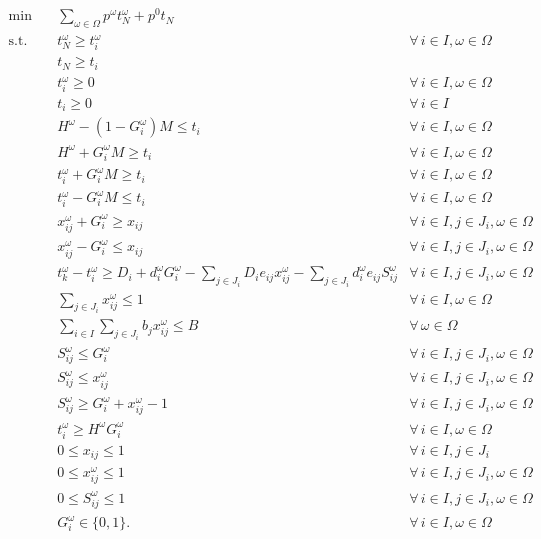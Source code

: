 \documentclass[11pt]{article}
\begin{document}
	\begin{subequations} \label{prob2:extensive}
		\begin{align}
		\min \quad & \sum_{\omega \in \Omega} p^\omega t_N^\omega + p^0 t_N& \\
		\text{s.t.} \quad & t_N^\omega \geq t_i^\omega & \forall \,i \in I, \omega \in \Omega \\
		& t_N \geq t_i & \label{cons:tN}\\
		& t_i^\omega \geq 0 & \forall \,i \in I, \omega \in \Omega\\
		& t_i \geq 0 & \forall \,i \in I\\
		& H^\omega - (1 - G_i^\omega) M \leq t_i & \forall \,i \in I, \omega \in \Omega \label{cons:F}\\
		& H^\omega + G_i^\omega M \geq t_i & \forall \,i \in I, \omega \in \Omega \label{cons:G}\\
		& t_i^\omega + G_i^\omega M \geq t_i & \forall \,i \in I, \omega \in \Omega \label{cons:tf1}\\
		& t_i^\omega - G_i^\omega M \leq t_i & \forall \,i \in I, \omega \in \Omega \label{cons:tf2}\\
		& x_{ij}^\omega + G_i^\omega \geq x_{ij} & \forall \,i \in I, j \in J_i, \omega \in \Omega \label{cons:xf1}\\
		& x_{ij}^\omega - G_i^\omega \leq x_{ij} & \forall \,i \in I, j \in J_i, \omega \in \Omega \label{cons:xf2}\\
		& t_k^\omega - t_i^\omega \geq D_i + d_i^\omega G_i^\omega -\sum_{j \in J_i} D_i e_{ij} x_{ij}^\omega - \sum_{j \in J_i} d_i^\omega e_{ij} S_{ij}^\omega & \forall \,i \in I, j \in J_i, \omega \in \Omega \label{cons:duration}\\
		& \sum_{j \in J_i} x_{ij}^\omega \leq 1 & \forall \,i \in I, \omega \in \Omega \label{cons:crashLim}\\
		& \sum_{i \in I}\sum_{j \in J_i} b_jx_{ij}^\omega \leq B & \forall \,\omega \in \Omega \label{cons:budget}\\
		& S_{ij}^\omega \leq G_i^\omega & \forall \,i \in I, j \in J_i, \omega \in \Omega \label{cons:linearize1}\\
		& S_{ij}^\omega \leq x_{ij}^\omega & \forall \,i \in I, j \in J_i, \omega \in \Omega \label{cons:linearize2}\\
		& S_{ij}^\omega \geq G_i^\omega + x_{ij}^\omega - 1 & \forall \,i \in I, j \in J_i, \omega \in \Omega \label{cons:linearize3}\\
		& t_i^\omega \geq H^\omega G_i^\omega & \forall\, i \in I, \omega \in \Omega \\
		& 0 \leq x_{ij} \leq 1 & \forall \,i \in I, j \in J_i\\ 
		& 0 \leq x_{ij}^\omega \leq 1 & \forall \,i \in I, j \in J_i, \omega \in \Omega\\
		& 0 \leq S_{ij}^\omega \leq 1 & \forall \,i \in I, j \in J_i, \omega \in \Omega\\
		& G_i^\omega \in \{0,1\}. & \forall \,i \in I, \omega \in \Omega
		\end{align}
	\end{subequations}
\end{document}
